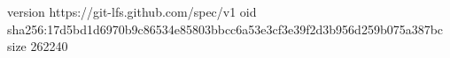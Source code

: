 version https://git-lfs.github.com/spec/v1
oid sha256:17d5bd1d6970b9c86534e85803bbcc6a53e3cf3e39f2d3b956d259b075a387bc
size 262240
